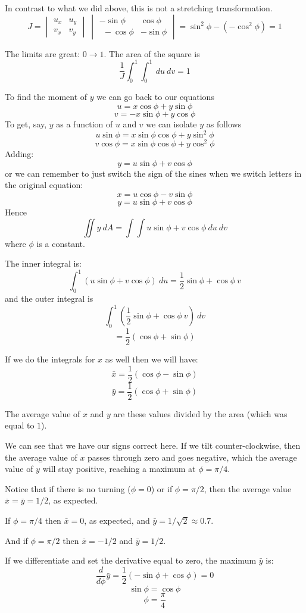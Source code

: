 \documentclass[11pt, oneside]{article}   	%
\begin{document}
In contrast to what we did above, this is not a stretching transformation.
\[ 
J = 
\begin{vmatrix}
u_x  &  u_y \\
v_x  &  v_y 
\end{vmatrix} 
\
\begin{vmatrix}
-\sin \phi  &  \cos \phi \\
\ \ -\cos \phi  & - \sin \phi
\end{vmatrix} 
= \sin^2 \phi - (- \cos^2 \phi) = 1 
\]

The limits are great:  $0 \rightarrow 1$.  The area of the square is
\[ \frac{1}{J} \int_0^1 \int_0^1 \ du \ dv = 1 \]

To find the moment of $y$ we can go back to our equations
\[ u = x \cos \phi + y \sin \phi \]
\[ v = -x \sin \phi + y \cos \phi \]
To get, say, $y$ as a function of $u$ and $v$ we can isolate $y$ as follows
\[ u \sin \phi = x \sin \phi \cos \phi + y \sin^2 \phi \]
\[ v \cos \phi = x \sin \phi \cos \phi + y \cos^2 \phi \]
Adding:
\[ y = u \sin \phi + v \cos \phi \]
or we can remember to just switch the sign of the sines when we switch letters in the original equation:
\[ x = u \cos \phi - v \sin \phi \]
\[ y = u \sin \phi + v \cos \phi \]
Hence
\[ \iint y \ dA = \int \int u \sin \phi + v \cos \phi \ du \ dv \]
where $\phi$ is a constant.

The inner integral is:
\[ \int_0^1 (u \sin \phi + v \cos \phi ) \ du = \frac{1}{2} \sin \phi + \cos \phi \ v \]
and the outer integral is
\[ \int_0^1  (\frac{1}{2} \sin \phi + \cos \phi \ v)  \ dv \]
\[ = \frac{1}{2} (\cos \phi + \sin \phi) \]

If we do the integrals for $x$ as well then we will have:
\[ \bar{x} =  \frac{1}{2} (\cos \phi - \sin \phi) \]
\[ \bar{y} =  \frac{1}{2} (\cos \phi + \sin \phi) \]

The average value of $x$ and $y$ are these values divided by the area (which was equal to $1$).

We can see that we have our signs correct here.  If we tilt counter-clockwise, then the average value of $x$ passes through zero and goes negative, which the average value of $y$ will stay positive, reaching a maximum at $\phi = \pi/4$.

Notice that if there is no turning ($\phi = 0$) or if $\phi = \pi/2$, then the average value $\bar{x} = \bar{y} = 1/2$, as expected.  

If $\phi = \pi/4$ then $ \bar{x} =0$, as expected, and $\bar{y} = 1/\sqrt{2} \approx 0.7$.

And if $\phi = \pi/2$ then $\bar{x} = - 1/2$ and $\bar{y} = 1/2$.

If we differentiate and set the derivative equal to zero, the maximum $\bar{y}$ is:
\[ \frac{d}{d \phi} \bar{y} =  \frac{1}{2} (- \sin \phi + \cos \phi) = 0 \]
\[ \sin \phi = \cos \phi \]
\[ \phi = \frac{\pi}{4} \]
\end{document}
